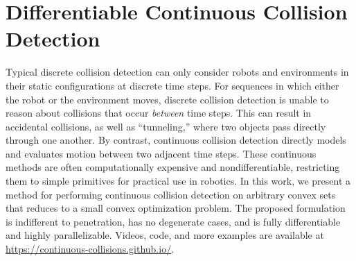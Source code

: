 \graphicspath{{cdcol/}}


\chapter{Differentiable Continuous Collision Detection}
\label{sec:cdcol}

Typical discrete collision detection can only consider robots and environments in their static configurations at discrete time steps. For sequences in which either the robot or the environment moves, discrete collision detection is unable to reason about collisions that occur \textit{between} time steps. This can result in accidental collisions, as well as ``tunneling,'' where two objects pass directly through one another. By contrast, continuous collision detection directly models and evaluates motion between two adjacent time steps. These continuous methods are often computationally expensive and nondifferentiable, restricting them to simple primitives for practical use in robotics. In this work, we present a method for performing continuous collision detection on arbitrary convex sets that reduces to a small convex optimization problem.  The proposed formulation is indifferent to penetration, has no degenerate cases, and is fully differentiable and highly parallelizable. Videos, code, and more examples are available at \url{https://continuous-collisions.github.io/}.

